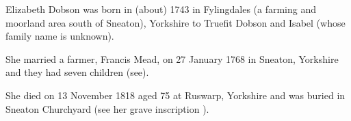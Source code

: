 
Elizabeth Dobson was born in (about) 1743 in Fylingdales (a farming and moorland area south of Sneaton), Yorkshire to Truefit Dobson and Isabel (whose family name is unknown). 

She married a farmer, Francis Mead, on 27 January 1768 in	Sneaton, Yorkshire and they had seven children (see).

She died on 13 November 1818 aged 75 at Ruswarp, Yorkshire and was buried in Sneaton Churchyard (see her grave inscription ).\cite{FMeadDeath}

